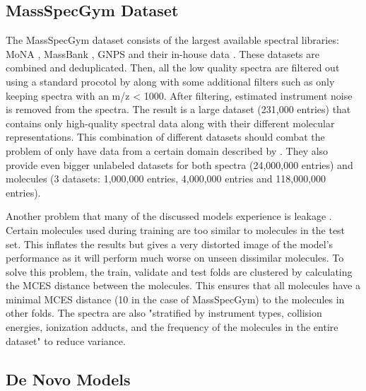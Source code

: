 \subsection{MassSpecGym Dataset}
The MassSpecGym dataset consists of the largest available spectral libraries: MoNA \cite{mona}, MassBank \cite{horai2010massbank}, GNPS \cite{wang2016sharing} and their in-house data \cite{brungs2024efficient}.
These datasets are combined and deduplicated.
Then, all the low quality spectra are filtered out using a standard procotol by \textcite{de2023reproducible} along with some additional filters such as only keeping spectra with an m/z < 1000. After filtering, estimated instrument noise is removed from the spectra. The result is a large dataset (231,000 entries) that contains only high-quality spectral data along with their different molecular representations. This combination of different datasets should combat the problem of only have data from a certain domain described by \textcite{kretschmer2023small}. They also provide even bigger unlabeled datasets for both spectra (24,000,000 entries) and molecules (3 datasets: 1,000,000 entries, 4,000,000 entries and 118,000,000 entries).

Another problem that many of the discussed models experience is leakage \cite{bushuiev2024massspecgym}. Certain molecules used during training are too similar to molecules in the test set. This inflates the results but gives a very distorted image of the model's performance as it will perform much worse on unseen dissimilar molecules. To solve this problem, the train, validate and test folds are clustered by calculating the \ac{MCES} distance between the molecules. This ensures that all molecules have a minimal \ac{MCES} distance (10 in the case of MassSpecGym) to the molecules in other folds. The spectra are also "stratified by instrument types, collision energies, ionization adducts, and the frequency of the molecules in the entire dataset" \cite{bushuiev2024massspecgym} to reduce variance.

\subsection{De Novo Models}

